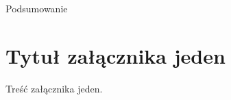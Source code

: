 \documentclass[brudnopis]{xmgr}
\begin{document}
\inputminted{scala}{listings/scala/missing-query-features.scala}

\summary
Podsumowanie

\appendix
\chapter{Tytuł załącznika jeden}

Treść załącznika jeden.

\nocite{*}



\listoftables

\listoffigures

\oswiadczenie
\end{document}
